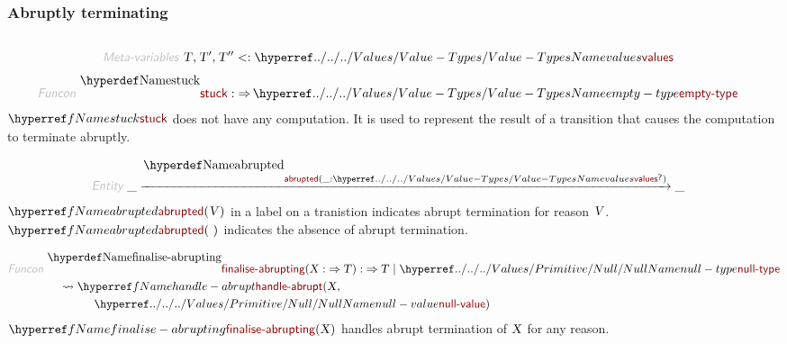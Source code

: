 \subsubsection*{Abruptly terminating}\hypertarget{abruptly-terminating}{}\label{abruptly-terminating}

\begin{align*}
  [ ~ 
  \KEY{Funcon} ~ & \NAMEREF{stuck} \\
  \KEY{Entity} ~ & \NAMEREF{abrupted} \\
  \KEY{Funcon} ~ & \NAMEREF{finalise-abrupting} \\
  \KEY{Funcon} ~ & \NAMEREF{abrupt} \\
  \KEY{Funcon} ~ & \NAMEREF{handle-abrupt} \\
  \KEY{Funcon} ~ & \NAMEREF{finally}
  ~ ]
\end{align*}
\begin{align*}
  \KEY{Meta-variables} ~ 
  & \VAR{T}, \VAR{T}', \VAR{T}'' <: \NAMEHYPER{../../../Values}{Value-Types}{values}
\end{align*}
\begin{align*}
  \KEY{Funcon} ~ 
  & \NAMEDECL{stuck} :  \TO \NAMEHYPER{../../../Values}{Value-Types}{empty-type}
\end{align*}
$\SHADE{\NAMEREF{stuck}}$ does not have any computation. It is used to represent the result of
  a transition that causes the computation to terminate abruptly.

\begin{align*}
  \KEY{Entity} ~ 
  & \_ \xrightarrow{\NAMEDECL{abrupted}(\_ : \NAMEHYPER{../../../Values}{Value-Types}{values}\QUERY)} \_
\end{align*}
$\SHADE{\NAMEREF{abrupted}
           ( \VAR{V} )}$ in a label on a tranistion indicates abrupt termination for
  reason $\SHADE{\VAR{V}}$. $\SHADE{\NAMEREF{abrupted}
           (  ~  )}$ indicates the absence of abrupt termination.

\begin{align*}
  \KEY{Funcon} ~ 
  & \NAMEDECL{finalise-abrupting}(\VAR{X} :  \TO \VAR{T}) :  \TO \VAR{T} \mid \NAMEHYPER{../../../Values/Primitive}{Null}{null-type} \\
  & \quad \leadsto \NAMEREF{handle-abrupt}
                     ( \VAR{X}, \\&\quad \quad \quad \quad 
                       \NAMEHYPER{../../../Values/Primitive}{Null}{null-value} )
\end{align*}
$\SHADE{\NAMEREF{finalise-abrupting}
           ( \VAR{X} )}$ handles abrupt termination of $\SHADE{\VAR{X}}$ for any reason.

